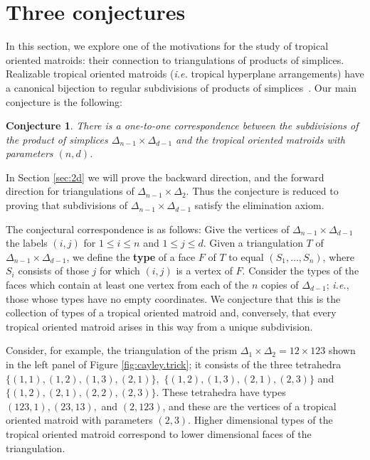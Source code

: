 \documentclass[11pt]{amsart}
\newtheorem{conj}[thm]{Conjecture}
\begin{document}
\section{Three conjectures}
\label{sec:conjectures}

In this section, we explore one of the motivations for the study of tropical oriented matroids: their connection to triangulations of products of simplices. 
Realizable tropical oriented matroids (\emph{i.e.} tropical hyperplane arrangements) have a canonical bijection to regular subdivisions of products of 
simplices~\cite{DS}. Our main conjecture is the following:

\begin{conj}\label{anytriang}
There is a one-to-one correspondence between the subdivisions of the product of simplices $\Delta_{n-1} \times \Delta_{d-1}$ and the tropical oriented matroids with parameters $(n,d)$.
\end{conj}

In Section \ref{sec:2d} we will prove the backward direction, and the forward direction for triangulations of $\Delta_{n-1} \times \Delta_2$. Thus the conjecture is reduced to proving that subdivisions of $\Delta_{n-1} \times \Delta_{d-1}$ satisfy the elimination axiom.

The conjectural correspondence is as follows: 
Give the vertices of $\Delta_{n-1} \times \Delta_{d-1}$ the labels $(i, j)$ for $1 \leq i \leq n$ and $1 \leq j \leq d$. Given a triangulation $T$ of $\Delta_{n-1} \times \Delta_{d-1}$, we define the \textbf{type} of a face $F$ of $T$ to equal $(S_1, \ldots, S_n)$, where $S_i$ consists of those $j$ for which $(i, j)$ is a vertex of $F$. Consider the types of the faces which contain at least one vertex from each of the $n$ copies of $\Delta_{d-1}$; \emph{i.e.}, those whose types have no empty coordinates.
We conjecture that this is the collection of types of a tropical oriented matroid and, conversely, that every tropical oriented matroid arises in this way from a unique subdivision.

Consider, for example, the triangulation of the prism $\Delta_1 \times \Delta_2 = 12 \times 123$ shown in the left panel of Figure \ref{fig:cayley.trick}; it consists of the three tetrahedra $\{(1,1), (1,2), (1,3), (2,1)\},$ $\{(1,2), (1,3), (2,1), (2,3)\}$ and $\{(1,2), (2,1), (2,2), (2,3)\}$.
These tetrahedra have types $(123,1), (23,13),$ and $(2,123)$, and these are the vertices of a tropical oriented matroid with parameters $(2,3)$. Higher dimensional types of the tropical oriented matroid correspond to lower dimensional faces of the triangulation.
\end{document}
